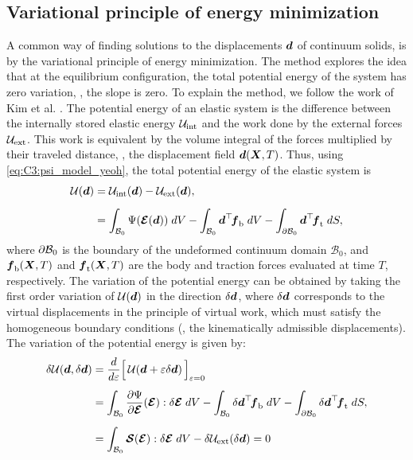 \subsection{Variational principle of energy minimization}
A common way of finding solutions to the displacements ${\boldsymbol{d}}$ of continuum solids, is by the variational principle of energy minimization. The method explores the idea that at the equilibrium configuration, the total potential energy of the system has zero variation, \ie, the slope is zero. To explain the method, we follow the work of Kim et al. \cite{Kim2018}. The potential energy of an elastic system is the difference between the internally stored elastic energy $\mathcal{U}_{\textrm{int}}$ and the work done by the external forces $\mathcal{U}_{\textrm{ext}}$. This work is equivalent by the volume integral of the forces multiplied by their traveled distance, \ie, the displacement field ${\boldsymbol{d}}({\boldsymbol{X}},T)$. Thus, using \eqref{eq:C3:psi_model_yeoh}, the total potential energy of the elastic system is
%
\begin{align}
\mathcal{U}({\boldsymbol{d}}) &= \mathcal{U}_{\textrm{int}}({\boldsymbol{d}}) - \mathcal{U}_{\textrm{ext}}({\boldsymbol{d}}),  \notag\\[0.5em]
& = \int_{\mathcal{B}_0} \Psi(\boldsymbol{\mathcal{E}}({\boldsymbol{d}})) \; dV -  \int_{\mathcal{B}_0} {\boldsymbol{d}}^\top \!{\boldsymbol{f}}_{\textrm{b}}   \; dV - \int_{\partial \mathcal{B}_0} {\boldsymbol{d}}^\top \!{\boldsymbol{f}}_{\textrm{t}} \; dS,
\end{align}
%
where $\partial \mathcal{B}_0$ is the boundary of the undeformed continuum domain $\mathcal{B}_0$, and ${\boldsymbol{f}}_{\textrm{b}}({\boldsymbol{X}},T)$ and ${\boldsymbol{f}}_{\textrm{t}}({\boldsymbol{X}},T)$ are the body and traction forces evaluated at time $T$, respectively. The variation of the potential energy can be obtained by taking the first order variation of $\mathcal{U}({\boldsymbol{d}})$ in the direction $\delta {\boldsymbol{d}}$, where $\delta {\boldsymbol{d}}$ corresponds to the virtual displacements in the principle of virtual work, which must satisfy the homogeneous boundary conditions (\ie, the kinematically admissible displacements).  The variation of the potential energy is given by:
%
\begin{align}
\delta \mathcal{U} ({\boldsymbol{d}}, \delta {\boldsymbol{d}}) & =  \frac{d}{d\varepsilon} \Big[ \,\mathcal{U} ({\boldsymbol{d}} + \varepsilon \delta {\boldsymbol{d}}) \, \Big]_{\varepsilon = 0} \notag \\[0.5em]
& =  \int_{\mathcal{B}_0} \frac{\partial \Psi}{\partial \boldsymbol{\mathcal{E}}}(\boldsymbol{\mathcal{E}}) : \delta \boldsymbol{\mathcal{E}} \; dV - \int_{\mathcal{B}_0}  \delta {\boldsymbol{d}}^\top \! {\boldsymbol{f}}_{\textrm{b}} \; dV - \int_{\partial \mathcal{B}_0}  \delta {\boldsymbol{d}}^\top \! {\boldsymbol{f}}_{\textrm{t}}  \; dS, \notag \\[0.5em]
& =  \int_{\mathcal{B}_0}\boldsymbol{\mathcal{S}}(\boldsymbol{\mathcal{E}}) : \delta \boldsymbol{\mathcal{E}} \; dV - \delta \mathcal{U}_{\textrm{ext}}(\delta {\boldsymbol{d}}) = 0
\end{align}
